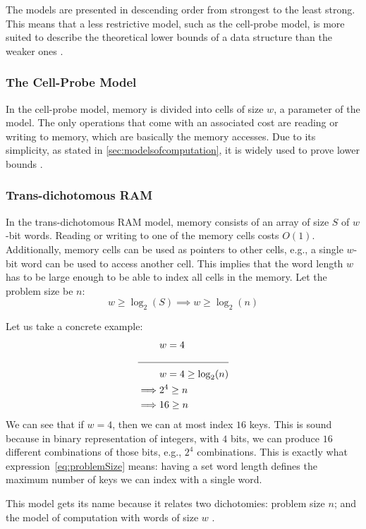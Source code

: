 The models are presented in descending order from strongest to the least strong. This means that a less restrictive model, such as the cell-probe model, is more suited to describe the theoretical lower bounds of a data structure than the weaker ones \cite{erikdemainelec11}.

\subsubsection{The Cell-Probe Model}
In the cell-probe model, memory is divided into cells of size $w$, a parameter of the model.
The only operations that come with an associated cost are reading or writing to memory, which are basically the memory accesses.
Due to its simplicity, as stated in \ref{sec:modelsofcomputation}, it is widely used to prove lower bounds \cite{erikdemainelec11}.

\subsubsection{Trans-dichotomous RAM} \label{sec:transdichotomousRAM}
In the trans-dichotomous RAM model, memory consists of an array of size $S$ of $w$-bit words.
Reading or writing to one of the memory cells costs $O(1)$.
Additionally, memory cells can be used as pointers to other cells, e.g., a single $w$-bit word can be used to access another cell.
This implies that the word length $w$ has to be large enough to be able to index all cells in the memory.
Let the problem size be $n$:
\begin{equation} \label{eq:problemSize}
    w \ge \log_2(S) \implies w \ge \log_2(n)
\end{equation}

Let us take a concrete example:
\begin{align*}
    &w = 4 \\
    \cline{1-2}
    &w = 4 \geq \log_2(n) \\
    \implies &2^4 \geq n \\
    \implies &16 \geq n
\end{align*}
We can see that if $w = 4$, then we can at most index $16$ keys. This is sound because in binary representation of integers, with $4$ bits, we can produce $16$ different combinations of those bits, e.g., $2^4$ combinations. This is exactly what expression~\ref{eq:problemSize} means: having a set word length defines the maximum number of keys we can index with a single word.

This model gets its name because it relates two dichotomies: problem size $n$; and the model of computation with words of size $w$ \cite{erikdemainelec11}. 

